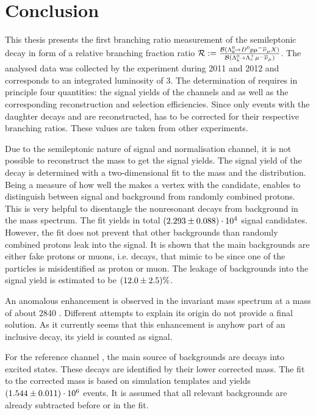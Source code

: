 \chapter{Conclusion}
\label{sec:Conclusion}
This thesis presents the first branching ratio measurement of the semileptonic decay \LbToDpmunuX in form of a relative branching fraction ratio $\mathcal{R} := \frac{{\cal B}({{\Lambda}^0_{b}}\!\rightarrow {\ensuremath{{D}^0}}{\ensuremath{p}}{\ensuremath{\mu^-}}{\ensuremath{{\overline{\nu}}_\mu}} X)}{{\cal B}({{\Lambda}^0_{b}}\!\rightarrow {\ensuremath{{\Lambda}^+_{c}}}{\ensuremath{\mu^-}}{\ensuremath{{\overline{\nu}}_\mu}})}$.
The analysed data was collected by the \lhcb experiment during 2011 and 2012 and corresponds to an integrated luminosity of 3\invfb.
The determination of \R requires in principle four quantities: the signal yields of the channels \LbToDpmunuX and \LbToLcmunu as well as the corresponding reconstruction and selection efficiencies.
Since only events with the daughter decays \DToKpi and \LcTopKpi are reconstructed, \R has to be corrected for their respective branching ratios.
These values are taken from other experiments.

Due to the semileptonic nature of signal and normalisation channel, it is not possible to reconstruct the \Lb mass to get the signal yields.
The signal yield of the decay \LbToDpmunuX is determined with a two-dimensional fit to the \Dz\proton mass and the \logIP distribution.
Being a measure of how well the \proton makes a vertex with the \Dz\mun candidate, \logIP enables to distinguish between signal and background from randomly combined protons.
This is very helpful to disentangle the nonresonant \LbToDpmunuX decays from background in the \Dz\proton mass spectrum.
The fit yields in total $(2.293 \pm 0.088)\cdot 10^{4}$ signal candidates.
However, the fit does not prevent that other backgrounds than randomly combined protons leak into the signal.
It is shown that the main backgrounds are either fake protons or muons, i.e. decays, that mimic to be \LbToDpmunuX since one of the particles is misidentified as proton or muon.
The leakage of backgrounds into the signal yield is estimated to be $(12.0 \pm 2.5)\%$.

An anomalous enhancement is observed in the invariant \Dz\proton mass spectrum at a mass of about 2840 \mev.
Different attempts to explain its origin do not provide a final solution.
As it currently seems that this enhancement is anyhow part of an inclusive \LbToDpmunuX decay, its yield is counted as signal.

For the reference channel \LbToLcmunu, the main source of backgrounds are \Lb decays into excited \Lcstar states.
These decays are identified by their lower corrected \Lb mass.
The fit to the corrected mass is based on simulation templates and yields $(1.544 \pm 0.011)\cdot 10^{6}$ \LbToLcmunu events.
It is assumed that all relevant backgrounds are already subtracted before or in the fit.

